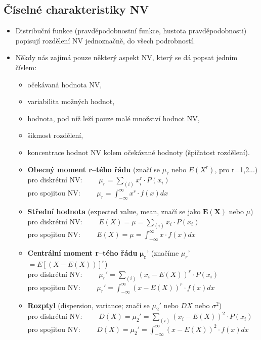 \subsection{Číselné charakteristiky NV}
\begin{itemize}
	\item Distribuční funkce (pravděpodobnostní funkce, hustota pravděpodobnosti) popisují rozdělení NV jednoznačně, do všech podrobností. 
	\item Někdy nás zajímá pouze některý aspekt NV, který se dá popsat jedním číslem:
	\begin{itemize}
		\item očekávaná hodnota NV,
		\item variabilita možných hodnot,
		\item hodnota, pod níž leží pouze malé množství hodnot NV,
		\item šikmost rozdělení,
		\item koncentrace hodnot NV kolem očekávané hodnoty (špičatost rozdělení).\\

		\item \textbf{Obecný moment r--tého řádu} (značí se $\mu_r$ nebo $E(X^r)$, pro r=1,2...) \\pro diskrétní NV: $\qquad \mu_r = \sum_{(i)}x_i^r \cdot P(x_i)$ \\pro spojitou NV: $\qquad \mu_r = \int_{-\infty}^{\infty} x^r \cdot f(x) dx$
		\item \textbf{Střední hodnota} (expected value, mean, značí se jako $\mathbf{E(X)}$ nebo $\mu$) \\pro diskrétní NV: $\qquad E(X) = \mu = \sum_{(i)}x_i \cdot P(x_i)$\\pro spojitou NV: $\qquad E(X) = \mu = \int_{-\infty}^{\infty} x \cdot f(x)dx$
		\item \textbf{Centrální moment r--tého řádu} $\mathbf{\mu_r}$' (značíme $\mu_r$' $= E[(X - E(X))]^r$) \\pro diskrétní NV: $\qquad \mu_r' = \sum_{(i)}(x_i -E(X))^r \cdot P(x_i)$\\pro spojitou NV: $\qquad \mu_r' = \int_{-\infty}^{\infty} (x - E(X))^r \cdot f(x)dx$
		\item \textbf{Rozptyl} (dispersion, variance; značí se $\mu_2'$ nebo $DX$ nebo $\sigma^2$) \\pro diskrétní NV: $\qquad D(X) = \mu_2' = \sum_{(i)}(x_i -E(X))^2 \cdot P(x_i)$\\pro spojitou NV: $\qquad D(X) = \mu_2' = \int_{-\infty}^{\infty} (x - E(X))^2 \cdot f(x)dx$
	\end{itemize}
\end{itemize}

